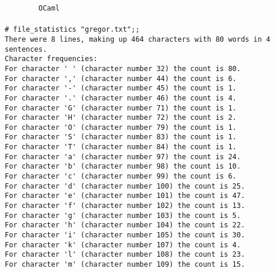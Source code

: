 \documentclass[]{book}
\newcommand{\smspace}{\vspace{4mm}}
\begin{document}
\smspace
\noindent\verb!        OCaml!\\
\noindent\\
\noindent\verb!# file_statistics "gregor.txt";;!\\
\verb!There were 8 lines, making up 464 characters with 80 words in 4 sentences.!\\
\verb!Character frequencies:!\\
\verb!For character ' ' (character number 32) the count is 80.!\\
\verb!For character ',' (character number 44) the count is 6.!\\
\verb!For character '-' (character number 45) the count is 1.!\\
\verb!For character '.' (character number 46) the count is 4.!\\
\verb!For character 'G' (character number 71) the count is 1.!\\
\verb!For character 'H' (character number 72) the count is 2.!\\
\verb!For character 'O' (character number 79) the count is 1.!\\
\verb!For character 'S' (character number 83) the count is 1.!\\
\verb!For character 'T' (character number 84) the count is 1.!\\
\verb!For character 'a' (character number 97) the count is 24.!\\
\verb!For character 'b' (character number 98) the count is 10.!\\
\verb!For character 'c' (character number 99) the count is 6.!\\
\verb!For character 'd' (character number 100) the count is 25.!\\
\verb!For character 'e' (character number 101) the count is 47.!\\
\verb!For character 'f' (character number 102) the count is 13.!\\
\verb!For character 'g' (character number 103) the count is 5.!\\
\verb!For character 'h' (character number 104) the count is 22.!\\
\verb!For character 'i' (character number 105) the count is 30.!\\
\verb!For character 'k' (character number 107) the count is 4.!\\
\verb!For character 'l' (character number 108) the count is 23.!\\
\verb!For character 'm' (character number 109) the count is 15.!\\
\end{document}
